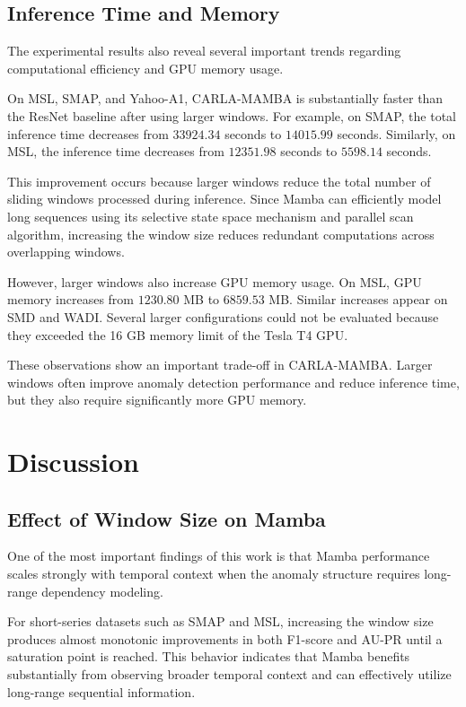 \documentclass[runningheads]{llncs}
\begin{document}
\subsection{Inference Time and Memory}

The experimental results also reveal several important trends regarding computational efficiency and GPU memory usage.

On MSL, SMAP, and Yahoo-A1, CARLA-MAMBA is substantially faster than the ResNet baseline after using larger windows. For example, on SMAP, the total inference time decreases from $33924.34$ seconds to $14015.99$ seconds. Similarly, on MSL, the inference time decreases from $12351.98$ seconds to $5598.14$ seconds.

This improvement occurs because larger windows reduce the total number of sliding windows processed during inference. Since Mamba can efficiently model long sequences using its selective state space mechanism and parallel scan algorithm, increasing the window size reduces redundant computations across overlapping windows.

However, larger windows also increase GPU memory usage. On MSL, GPU memory increases from $1230.80$ MB to $6859.53$ MB. Similar increases appear on SMD and WADI. Several larger configurations could not be evaluated because they exceeded the 16 GB memory limit of the Tesla T4 GPU.

These observations show an important trade-off in CARLA-MAMBA. Larger windows often improve anomaly detection performance and reduce inference time, but they also require significantly more GPU memory.

\section{Discussion}

\subsection{Effect of Window Size on Mamba}

One of the most important findings of this work is that Mamba performance scales strongly with temporal context when the anomaly structure requires long-range dependency modeling.

For short-series datasets such as SMAP and MSL, increasing the window size produces almost monotonic improvements in both F1-score and AU-PR until a saturation point is reached. This behavior indicates that Mamba benefits substantially from observing broader temporal context and can effectively utilize long-range sequential information.
\end{document}
